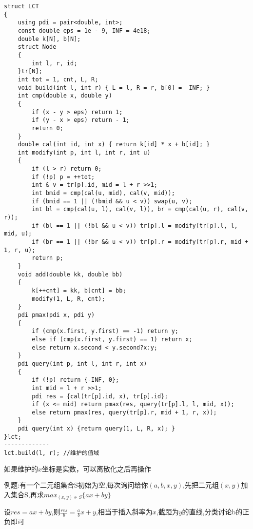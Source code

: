 \documentclass[a4paper, fontset=none]{ctexart}
\begin{document}
\begin{verbatim}
struct LCT
{
    using pdi = pair<double, int>;
    const double eps = 1e - 9, INF = 4e18;
    double k[N], b[N];
    struct Node
    {
        int l, r, id;
    }tr[N];
    int tot = 1, cnt, L, R;
    void build(int l, int r) { L = l, R = r, b[0] = -INF; }
    int cmp(double x, double y)
    {
        if (x - y > eps) return 1;
        if (y - x > eps) return - 1;
        return 0;
    }
    double cal(int id, int x) { return k[id] * x + b[id]; }
    int modify(int p, int l, int r, int u)
    {
        if (l > r) return 0;
        if (!p) p = ++tot;
        int & v = tr[p].id, mid = l + r >>1;
        int bmid = cmp(cal(u, mid), cal(v, mid));
        if (bmid == 1 || (!bmid && u < v)) swap(u, v);
        int bl = cmp(cal(u, l), cal(v, l)), br = cmp(cal(u, r), cal(v, r));
        if (bl == 1 || (!bl && u < v)) tr[p].l = modify(tr[p].l, l, mid, u);
        if (br == 1 || (!br && u < v)) tr[p].r = modify(tr[p].r, mid + 1, r, u);
        return p;
    }
    void add(double kk, double bb)
    {
        k[++cnt] = kk, b[cnt] = bb;
        modify(1, L, R, cnt);
    }
    pdi pmax(pdi x, pdi y)
    {
        if (cmp(x.first, y.first) == -1) return y;
        else if (cmp(x.first, y.first) == 1) return x;
        else return x.second < y.second?x:y;
    }
    pdi query(int p, int l, int r, int x)
    {
        if (!p) return {-INF, 0};
        int mid = l + r >>1;
        pdi res = {cal(tr[p].id, x), tr[p].id};
        if (x <= mid) return pmax(res, query(tr[p].l, l, mid, x));
        else return pmax(res, query(tr[p].r, mid + 1, r, x));
    }
    pdi query(int x) {return query(1, L, R, x); }
}lct;
-------------
lct.build(l, r); //维护的值域
\end{verbatim}

如果维护的$x$坐标是实数，可以离散化之后再操作

例题:有一个二元组集合S初始为空,每次询问给你$(a, b, x, y)$,先把二元组$(x, y)$加入集合S,再求$max_{(x, y)\in S}\{ax+by\}$

设$res=ax+by$,则$\frac{res}{b}=\frac{a}{b}x+y$,相当于插入斜率为$x$,截距为$y$的直线,分类讨论b的正负即可
\end{document}
